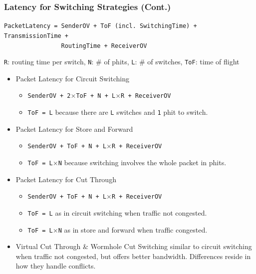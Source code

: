 \documentclass{beamer}
\renewcommand{\emph}[1]{\textcolor{structure}{#1}}
\newcommand{\emp}[1]{\textcolor{DikuRed}{ #1}}
\begin{document}
\begin{frame}[fragile,t]
\frametitle{Latency for Switching Strategies (Cont.)}

\alert{\scriptsize {\tt PacketLatency = SenderOV + ToF (incl. SwitchingTime) + TransmissionTime +}}\\
\alert{\scriptsize {\tt~~~~~~~~~~~~~~~~RoutingTime + ReceiverOV}}
\medskip

{\scriptsize {\tt R}: routing time per switch, {\tt N}: \# of phits, 
             {\tt L}: \# of switches, {\tt ToF}: time of flight}

\begin{itemize}
    \item \emph{Packet Latency for Circuit Switching}
        \begin{itemize}
            \item \emp{\tt SenderOV + 2$\times$ToF + N + L$\times$R + ReceiverOV}
            \item \emp{\tt ToF = L} because there are {\tt L} switches and {\tt 1} {\sc phit} to switch.
        \end  {itemize}

    \item \emph{Packet Latency for Store and Forward}
        \begin{itemize}
            \item \emp{\tt SenderOV + ToF + N + L$\times$R + ReceiverOV}
            \item \emp{\tt ToF = L$\times$N} because switching involves the whole packet in {\sc phit}s.
        \end  {itemize}

    \item \emph{Packet Latency for Cut Through}
        \begin{itemize}
            \item \emp{\tt SenderOV + ToF + N + L$\times$R + ReceiverOV}
            \item \emp{\tt ToF = L} as in circuit switching when traffic \emph{not congested}.
            \item \emp{\tt ToF = L$\times$N} as in store and forward when \alert{traffic congested}.
        \end  {itemize}

    \item \emph{Virtual Cut Through \& Wormhole Cut Switching} similar to circuit switching
            when traffic not congested, but offers \emph{better bandwidth}.
            Differences reside in how they handle conflicts. 
\end  {itemize}
\end{frame}
\end{document}

